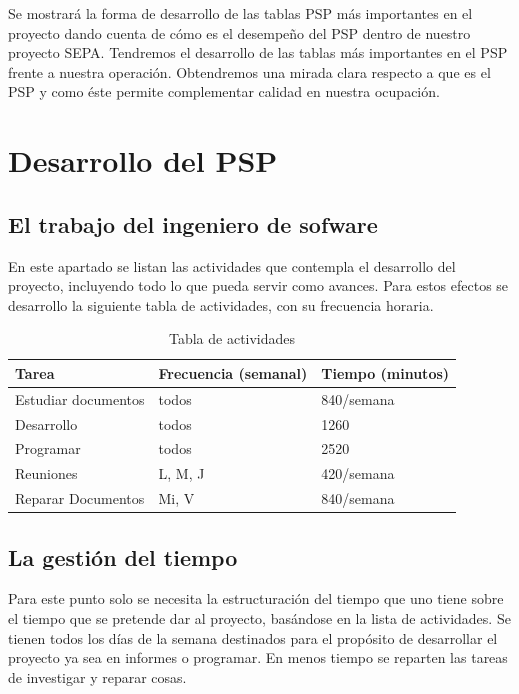 \documentclass[a4paper,12pt,openany,oneside]{book}
\begin{document}
Se mostrará la forma de desarrollo de las tablas PSP más importantes en el proyecto dando cuenta de cómo es el desempeño del PSP dentro de nuestro proyecto SEPA. Tendremos el desarrollo de las tablas más importantes en el PSP frente a nuestra operación. Obtendremos una mirada clara respecto a que es el PSP y como éste permite complementar calidad en nuestra ocupación.

\section{Desarrollo del PSP}
\subsection{El trabajo del ingeniero de sofware}
En este apartado se listan las actividades que contempla el desarrollo del proyecto, incluyendo todo lo que pueda servir como avances. Para estos efectos se desarrollo la siguiente tabla de actividades, con su frecuencia horaria.

\newpage
\begin{table}
\begin{tabular}{|l | l | l |}
\hline
\textbf{Tarea} & \textbf{Frecuencia (semanal)} & \textbf{Tiempo (minutos)} \\
\hline
Estudiar documentos & todos & 840/semana\\
\hline
Desarrollo & todos & 1260\\
\hline
Programar & todos & 2520\\
\hline
Reuniones & L, M, J & 420/semana\\
\hline
Reparar Documentos & Mi, V & 840/semana\\
\hline
\end{tabular}
\caption{Tabla de actividades}
\end{table}
\subsection{La gestión del tiempo}
Para este punto solo se necesita la estructuración del tiempo que uno tiene sobre el tiempo que se pretende dar al proyecto, basándose en la lista de actividades. Se tienen todos los días de la semana destinados para el propósito de desarrollar el proyecto ya sea en informes o programar. En menos tiempo se reparten las tareas de investigar y reparar cosas.
\end{document}
